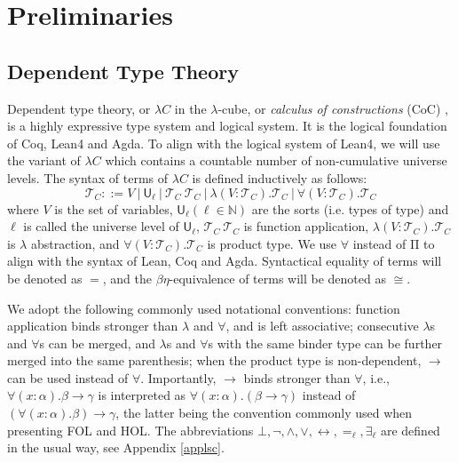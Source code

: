 \section{Preliminaries}

\subsection{Dependent Type Theory}\label{subdtt}

  Dependent type theory, or $\lambda C$ in the $\lambda$-cube,
  or \textit{calculus of constructions} (CoC) \cite{LambdaWithType},
  is a highly expressive type system and logical system. It is the logical
  foundation of Coq, Lean4 and Agda. To align with the logical system of
  Lean4, we will use the variant of $\lambda C$ which contains a countable
  number of non-cumulative universe levels. The syntax of terms of $\lambda C$ is defined
  inductively as follows:
  $$\mathcal{T}_C ::= V \ | \ \mathsf{U}_\ell \ | \ \mathcal{T}_C \ \mathcal{T}_C \ |
    \ \lambda (V : \mathcal{T}_C). \mathcal{T}_C \ | \ \forall (V : \mathcal{T}_C). \mathcal{T}_C$$
  where $V$ is the set of variables, $\mathsf{U}_\ell (\ell \in \mathbb{N})$ are
  the sorts (i.e. types of type) and $\ell$ is called the universe level
  of $\mathsf{U}_\ell$, $\mathcal{T}_C \ \mathcal{T}_C$ is function application,
  $\lambda (V : \mathcal{T}_C). \mathcal{T}_C$ is $\lambda$ abstraction, and
  $\forall (V : \mathcal{T}_C). \mathcal{T}_C$ is product type.
  We use $\forall$ instead of $\mathrm{\Pi}$ to align with the syntax of Lean, Coq and Agda.
  Syntactical equality of terms will be denoted as $=$, and the $\beta\eta$-equivalence of terms will be
  denoted as $\cong$.
  
  We adopt the following commonly used notational conventions:
  function application binds stronger than $\lambda$ and $\forall$, and is left associative;
  consecutive $\lambda$s and $\forall$s can be merged, and $\lambda$s and $\forall$s with the same
  binder type can be further merged into the same parenthesis; when the product type is non-dependent,
  $\to$ can be used instead of $\forall$. Importantly, $\to$ binds stronger than $\forall$, i.e.,
  $\forall (x : \alpha). \beta \to \gamma$ is interpreted as $\forall (x : \alpha). (\beta \to \gamma)$
  instead of $(\forall (x : \alpha). \beta) \to \gamma$, the latter being the convention commonly used
  when presenting FOL and HOL. The abbreviations $\bot, \neg, \land, \lor, \leftrightarrow, =_\ell, \exists_\ell$
  are defined in the usual way, see Appendix \ref{applsc}.

